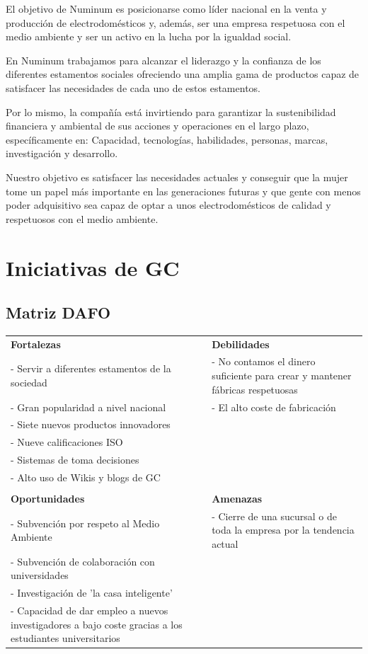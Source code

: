 \documentclass[a4paper]{article}
\begin{document}
El objetivo de Numinum es posicionarse como líder nacional en la venta y producción de electrodomésticos y, además, ser una empresa respetuosa con el medio ambiente y ser un activo en la lucha por la igualdad social.

En Numinum trabajamos para alcanzar el liderazgo y la confianza de los diferentes estamentos sociales ofreciendo una amplia gama de productos capaz de satisfacer las necesidades de cada uno de estos estamentos.

Por lo mismo, la compañía está invirtiendo para garantizar la sustenibilidad financiera y ambiental de sus acciones y operaciones en el largo plazo, específicamente en: Capacidad, tecnologías, habilidades, personas, marcas, investigación y desarrollo.

Nuestro objetivo es satisfacer las necesidades actuales y conseguir que la mujer tome un papel más importante en las generaciones futuras y que gente con menos poder adquisitivo sea capaz de optar a unos electrodomésticos de calidad y respetuosos con el medio ambiente.
\newpage


\section{Iniciativas de GC}

\subsection{Matriz DAFO}

\begin{table}[ht!]
	\centering
	\begin{tabular}{ p{6cm} | p{6cm} }
		\textbf{Fortalezas} & \textbf{Debilidades}\\
		- Servir a diferentes estamentos de la sociedad & - No contamos el dinero suficiente para crear y mantener fábricas respetuosas \\
		- Gran popularidad a nivel nacional & - El alto coste de fabricación  \\
		- Siete nuevos productos innovadores & \\
		- Nueve calificaciones ISO & \\
		- Sistemas de toma decisiones & \\
		- Alto uso de Wikis y blogs de GC & \\\hline\\
		\textbf{Oportunidades} & \textbf{Amenazas} \\
		- Subvención por respeto al Medio Ambiente & - Cierre de una sucursal o de toda la empresa por la tendencia actual\\
		- Subvención de colaboración con universidades & \\
		- Investigación de 'la casa inteligente' & \\
		- Capacidad de dar empleo a nuevos investigadores a bajo coste gracias a los estudiantes universitarios 
	\end{tabular}
\end{table}
\end{document}
